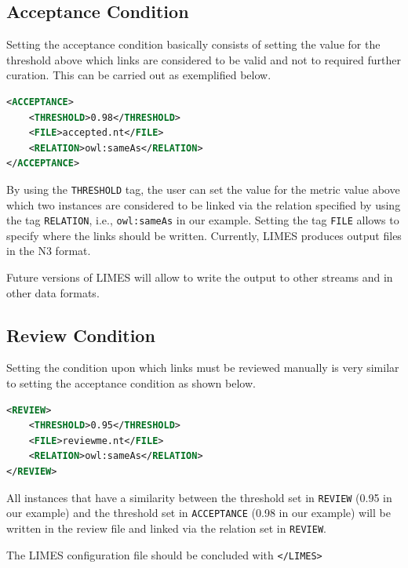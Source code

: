 \documentclass[a4paper, 11pt]{article}
\begin{document}
\subsection{Acceptance Condition}
Setting the acceptance condition basically consists of setting the value for the threshold above which links are considered to be valid and not to required further curation. This can be carried out as exemplified below.
\begin{ttfamily}
\begin{lstlisting}[language=XML,basicstyle=\scriptsize,numberstyle=\tiny]
<ACCEPTANCE>
	<THRESHOLD>0.98</THRESHOLD>
	<FILE>accepted.nt</FILE>
	<RELATION>owl:sameAs</RELATION>
</ACCEPTANCE>
\end{lstlisting}
\end{ttfamily}

By using the \verb#THRESHOLD# tag, the user can set the value for the metric value above which two instances are considered to be linked via the relation specified by using the tag \verb#RELATION#, i.e., \verb#owl:sameAs# in our example. Setting the tag \verb#FILE# allows to specify where the links should be written. Currently, LIMES produces output files in the N3 format.

Future versions of LIMES will allow to write the output to other streams and in other data formats.

\subsection{Review Condition}
Setting the condition upon which links must be reviewed manually is very similar to setting the acceptance condition as shown below.

\begin{ttfamily}
\begin{lstlisting}[language=XML,basicstyle=\scriptsize,numberstyle=\tiny]
<REVIEW>
	<THRESHOLD>0.95</THRESHOLD>
	<FILE>reviewme.nt</FILE>
	<RELATION>owl:sameAs</RELATION>
</REVIEW>
\end{lstlisting}
\end{ttfamily}

All instances that have a similarity between the threshold set in \texttt{REVIEW} (0.95 in our example) and the threshold set in \texttt{ACCEPTANCE} (0.98 in our example) will be written in the review file and linked via the relation set in \texttt{REVIEW}. 
 
The LIMES configuration file should be concluded with \texttt{</LIMES>}
\end{document}
